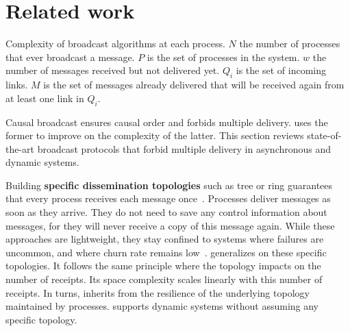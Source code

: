 
\section{Related work}
\label{sec:relatedwork}

\begin{table*}
  \begin{center}
    \caption{\label{table:complexity} Complexity of broadcast algorithms at each
      process. $N$ the number of processes that ever broadcast a message. $P$ is
      the set of processes in the system. $w$ the number of messages received
      but not delivered yet. $Q_i$ is the set of incoming links. $M$ is the
      set of messages already delivered that will be received again from at
      least one link in $Q_i$.}
  
  \end{center}
\end{table*}

Causal broadcast ensures causal order and forbids multiple
delivery. \RPCBROADCAST uses the former to improve on the complexity of the
latter.  This section reviews state-of-the-art broadcast protocols that forbid
multiple delivery in asynchronous and dynamic systems.

Building \textbf{specific dissemination topologies} such as tree or ring
guarantees that every process receives each message
once~\cite{bravo2017saturn,raynal2013distributed}. Processes deliver messages as
soon as they arrive. They do not need to save any control information about
messages, for they will never receive a copy of this message again. While these
approaches are lightweight, they stay confined to systems where failures are
uncommon, and where churn rate remains
low~\cite{krasikova2016hashtable}. \RPCBROADCAST generalizes on these specific
topologies. It follows the same principle where the topology impacts on the
number of receipts. Its space complexity scales linearly with this number of
receipts. In turns, \RPCBROADCAST inherits from the resilience of the underlying
topology maintained by processes. \RPCBROADCAST supports dynamic systems without
assuming any specific topology.


